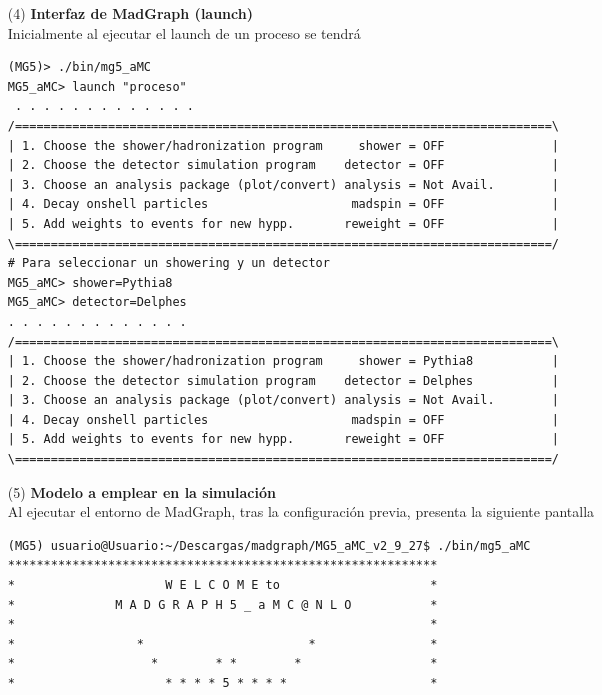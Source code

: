 \begin{itemize}
\begin{lstlisting}
# Verificando la resolucion
(MG5)> readlink -f Delphes/DelphesHepMC
<out> /home/usuario/Descargas/madgraph/MG5_aMC_v2_9_27/Delphes/DelphesHepMC2
\end{lstlisting}
\newpage
    \item[(4)] \textbf{Interfaz de MadGraph (launch)}\\
    Inicialmente al ejecutar el launch de un proceso se tendrá
\begin{lstlisting}
(MG5)> ./bin/mg5_aMC
MG5_aMC> launch "proceso"
 . . . . . . . . . . . . .
/===========================================================================\
| 1. Choose the shower/hadronization program     shower = OFF               |
| 2. Choose the detector simulation program    detector = OFF               |
| 3. Choose an analysis package (plot/convert) analysis = Not Avail.        |
| 4. Decay onshell particles                    madspin = OFF               |
| 5. Add weights to events for new hypp.       reweight = OFF               |
\===========================================================================/
# Para seleccionar un showering y un detector
MG5_aMC> shower=Pythia8
MG5_aMC> detector=Delphes
. . . . . . . . . . . . .
/===========================================================================\
| 1. Choose the shower/hadronization program     shower = Pythia8           |
| 2. Choose the detector simulation program    detector = Delphes           |
| 3. Choose an analysis package (plot/convert) analysis = Not Avail.        |
| 4. Decay onshell particles                    madspin = OFF               |
| 5. Add weights to events for new hypp.       reweight = OFF               |
\===========================================================================/
\end{lstlisting}
    \item[(5)] \textbf{Modelo a emplear en la simulación}\\
    Al ejecutar el entorno de MadGraph, tras la configuración previa, presenta la siguiente pantalla
\begin{lstlisting}
(MG5) usuario@Usuario:~/Descargas/madgraph/MG5_aMC_v2_9_27$ ./bin/mg5_aMC
************************************************************
*                     W E L C O M E to                     *
*              M A D G R A P H 5 _ a M C @ N L O           *
*                                                          *
*                 *                       *                *
*                   *        * *        *                  *
*                     * * * * 5 * * * *                    *

\end{lstlisting}
\end{itemize}
